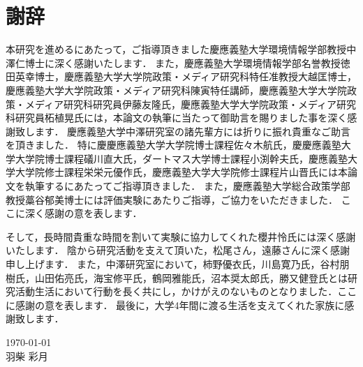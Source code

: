 \chapter*{謝辞}

本研究を進めるにあたって，ご指導頂きました慶應義塾大学環境情報学部教授中澤仁博士に深く感謝いたします．
また，慶應義塾大学環境情報学部名誉教授徳田英幸博士，慶應義塾大学大学院政策・メディア研究科特任准教授大越匡博士，慶應義塾大学大学院政策・メディア研究科陳寅特任講師，慶應義塾大学大学院政策・メディア研究科研究員伊藤友隆氏，慶應義塾大学大学院政策・メディア研究科研究員柘植晃氏には，本論文の執筆に当たって御助言を賜りました事を深く感謝致します．
慶應義塾大学中澤研究室の諸先輩方には折りに振れ貴重なご助言を頂きました．
特に慶慶應義塾大学大学院博士課程佐々木航氏，慶慶應義塾大学大学院博士課程礒川直大氏，ダートマス大学博士課程小渕幹夫氏，慶應義塾大学大学院修士課程栄栄元優作氏，慶應義塾大学大学院修士課程片山晋氏には本論文を執筆するにあたってご指導頂きました．
また，慶應義塾大学総合政策学部教授藁谷郁美博士には評価実験にあたりご指導，ご協力をいただきました．
ここに深く感謝の意を表します．

そして，長時間貴重な時間を割いて実験に協力してくれた櫻井怜氏には深く感謝いたします．
陰から研究活動を支えて頂いた，松尾さん，遠藤さんに深く感謝申し上げます．
また，中澤研究室において，柿野優衣氏，川島寛乃氏，谷村朋樹氏，山田佑亮氏，海宝修平氏，鶴岡雅能氏，沼本奨太郎氏，勝又健登氏とは研究活動生活において行動を長く共にし，かけがえのないものとなりました．ここに感謝の意を表します．
最後に，大学4年間に渡る生活を支えてくれた家族に感謝致します．

\begin{flushright}
\today\\
羽柴 彩月
\end{flushright}
